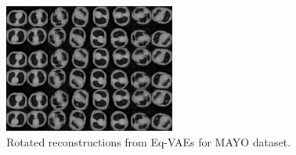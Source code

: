 \begin{figure}[ht!]
    \centering
    \includegraphics[width=0.5\textwidth]{pics/2_equiv_vae/mayo_rotated_reconstructed.png}
    \caption{
    Rotated reconstructions from Eq-VAEs for MAYO dataset.}
    \label{fig:mayo_train_points}
    \vspace*{\baselineskip}
\end{figure}